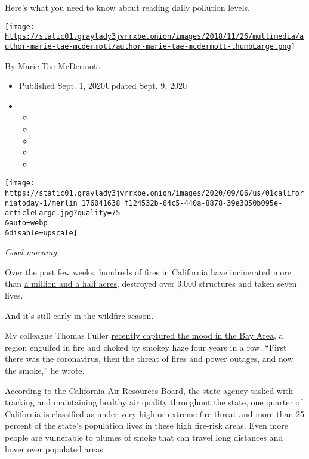 Here's what you need to know about reading daily pollution levels.

\href{https://www.nytimes3xbfgragh.onion/by/marie-tae-mcdermott}{\texttt{[image: https://static01.graylady3jvrrxbe.onion/images/2018/11/26/multimedia/author-marie-tae-mcdermott/author-marie-tae-mcdermott-thumbLarge.png]}}

By
\href{https://www.nytimes3xbfgragh.onion/by/marie-tae-mcdermott}{Marie
Tae McDermott}

\begin{itemize}
\item
  Published Sept. 1, 2020Updated Sept. 9, 2020
\item
  \begin{itemize}
  \item
  \item
  \item
  \item
  \item
  \end{itemize}
\end{itemize}

\texttt{[image: https://static01.graylady3jvrrxbe.onion/images/2020/09/06/us/01californiatoday-1/merlin\_176041638\_f124532b-64c5-440a-8878-39e3050b095e-articleLarge.jpg?quality=75\\\&auto=webp\\\&disable=upscale]}

\emph{Good morning.}

Over the past few weeks, hundreds of fires in California have
incinerated more than \href{https://www.fire.ca.gov/incidents/}{a
million and a half acres}, destroyed over 3,000 structures and taken
seven lives.

And it's still early in the wildfire season.

My colleague Thomas Fuller
\href{https://www.nytimes3xbfgragh.onion/2020/08/24/us/california-fires-wildfires.html}{recently
captured the mood in the Bay Area}, a region engulfed in fire and choked
by smokey haze four years in a row. ``First there was the coronavirus,
then the threat of fires and power outages, and now the smoke,'' he
wrote.

According to the \href{https://ww2.arb.ca.gov/}{California Air Resources
Board}, the state agency tasked with tracking and maintaining healthy
air quality throughout the state, one quarter of California is
classified as under very high or extreme fire threat and more than 25
percent of the state's population lives in these high fire-risk areas.
Even more people are vulnerable to plumes of smoke that can travel long
distances and hover over populated areas.


